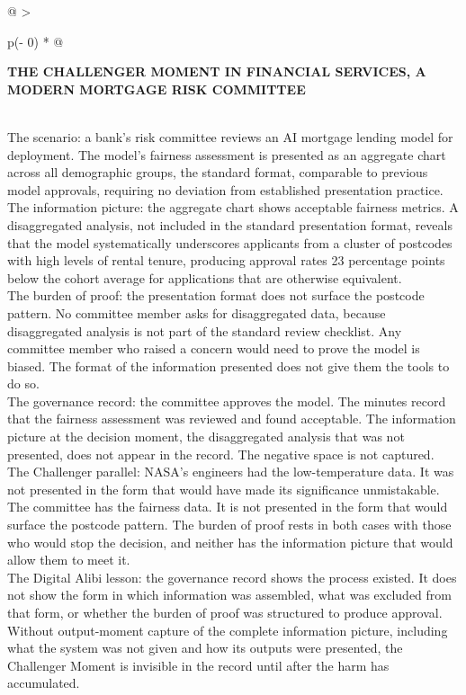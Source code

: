 \begin{longtable}[]{@{}
  >{\raggedright\arraybackslash}p{(\columnwidth - 0\tabcolsep) * }@{}}
\toprule\noalign{}
\begin{minipage}[b]{\linewidth}\raggedright
\textbf{THE CHALLENGER MOMENT IN FINANCIAL SERVICES, A MODERN MORTGAGE RISK COMMITTEE}
\end{minipage} \\
\midrule\noalign{}
\endhead
\bottomrule\noalign{}
\endlastfoot
The scenario: a bank's risk committee reviews an AI mortgage lending model for deployment. The model's fairness assessment is presented as an aggregate chart across all demographic groups, the standard format, comparable to previous model approvals, requiring no deviation from established presentation practice. \\
The information picture: the aggregate chart shows acceptable fairness metrics. A disaggregated analysis, not included in the standard presentation format, reveals that the model systematically underscores applicants from a cluster of postcodes with high levels of rental tenure, producing approval rates 23 percentage points below the cohort average for applications that are otherwise equivalent. \\
The burden of proof: the presentation format does not surface the postcode pattern. No committee member asks for disaggregated data, because disaggregated analysis is not part of the standard review checklist. Any committee member who raised a concern would need to prove the model is biased. The format of the information presented does not give them the tools to do so. \\
The governance record: the committee approves the model. The minutes record that the fairness assessment was reviewed and found acceptable. The information picture at the decision moment, the disaggregated analysis that was not presented, does not appear in the record. The negative space is not captured. \\
The Challenger parallel: NASA's engineers had the low-temperature data. It was not presented in the form that would have made its significance unmistakable. The committee has the fairness data. It is not presented in the form that would surface the postcode pattern. The burden of proof rests in both cases with those who would stop the decision, and neither has the information picture that would allow them to meet it. \\
The Digital Alibi lesson: the governance record shows the process existed. It does not show the form in which information was assembled, what was excluded from that form, or whether the burden of proof was structured to produce approval. Without output-moment capture of the complete information picture, including what the system was not given and how its outputs were presented, the Challenger Moment is invisible in the record until after the harm has accumulated. \\
\end{longtable}

